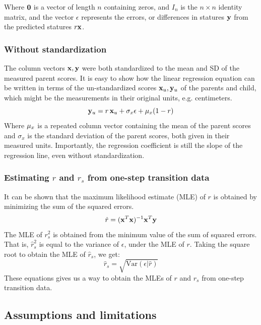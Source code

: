 \documentclass[a4paper,11pt]{article} %
\begin{document}
Where $\bold{0}$ is a vector of length $n$ containing zeros, and $I_n$ is the $n \times n$ identity matrix, and the vector $\epsilon$ represents the errors, or differences in statures $\bold{y}$ from the predicted statures $r\bold{x}$. 

\subsubsection*{Without standardization}
The column vectors $\bold{x}, \bold{y}$ were both standardized to the mean and SD of the measured parent scores. It is easy to show how the linear regression equation can be written in terms of the un-standardized scores $\bold{x}_u, \bold{y}_u$ of the parents and child, which might be the measurements in their original units, e.g. centimeters. 
$$\bold{y}_u =  r \, \bold{x}_u + \sigma_x\bold{\epsilon} +  \bold{\mu}_x(1-r)$$
Where $\bold{\mu}_x$ is a repeated column vector containing the mean of the parent scores and $\sigma_x$ is the standard deviation of the parent scores, both given in their measured units. Importantly, the regression coefficient is still the slope of the regression line, even without standardization. 


\subsubsection*{Estimating $r$ and $r_s$ from one-step transition data}
It can be shown that the maximum likelihood estimate (MLE) of $r$ is obtained by minimizing the sum of the squared errors. 
%
$$\hat{r} = (\bold{x}^T \bold{x})^{-1} \bold{x}^T \bold{y}$$
%
The MLE of $r_s^2$ is obtained from the minimum value of the sum of squared errors. That is, $\hat{r}_s^2$ is equal to the variance of $\epsilon$, under the MLE of $r$. Taking the square root to obtain the MLE of $\hat{r}_s$, we get:
%
$$\hat{r}_s = \sqrt{\mathrm{Var}({\epsilon} | \hat{r})}$$
%
These equations gives us a way to obtain the MLEs of $r$ and $r_s$ from one-step transition data. 



\subsection{Assumptions and limitations}
\end{document}
